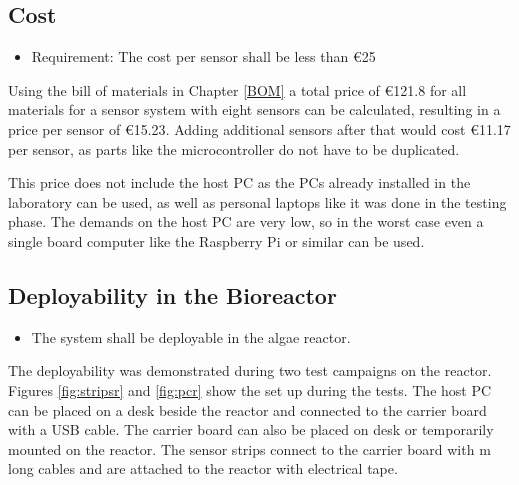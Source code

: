 \subsection{Cost}

\begin{itemize}
\item Requirement: The cost per sensor shall be less than \euro{25}
\end{itemize}

Using the bill of materials in Chapter \ref{BOM} a total price of \euro{121.8} for all materials for a sensor system with eight sensors can be calculated, resulting in a price per sensor of \euro{15.23}. Adding additional sensors after that would cost \euro{11.17} per sensor, as parts like the microcontroller do not have to be duplicated.

This price does not include the host PC as the PCs already installed in the laboratory can be used, as well as personal laptops like it was done in the testing phase. The demands on the host PC are very low, so in the worst case even a single board computer like the Raspberry Pi or similar can be used.

\subsection{Deployability in the Bioreactor}

\begin{itemize}
\item  The system shall be deployable in the algae reactor.\\
\end{itemize}

The deployability was demonstrated during two test campaigns on the reactor. Figures \ref{fig:stripsr} and \ref{fig:pcr} show the set up during the tests. The host PC can be placed on a desk beside the reactor and connected to the carrier board with a USB cable. The carrier board can also be placed on desk or temporarily mounted on the reactor. The sensor strips connect to the carrier board with \unit[1]{m} long cables and are attached to the reactor with electrical tape.

